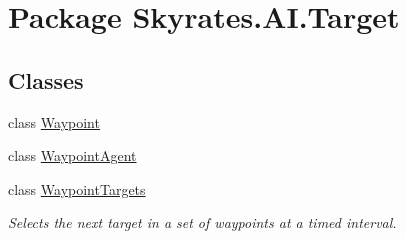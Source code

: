 \hypertarget{namespace_skyrates_1_1_a_i_1_1_target}{\section{Package Skyrates.\-A\-I.\-Target}
\label{namespace_skyrates_1_1_a_i_1_1_target}
}
\subsection*{Classes}
\begin{DoxyCompactItemize}
\item 
class \hyperlink{class_skyrates_1_1_a_i_1_1_target_1_1_waypoint}{Waypoint}
\item 
class \hyperlink{class_skyrates_1_1_a_i_1_1_target_1_1_waypoint_agent}{Waypoint\-Agent}
\item 
class \hyperlink{class_skyrates_1_1_a_i_1_1_target_1_1_waypoint_targets}{Waypoint\-Targets}
\begin{DoxyCompactList}\small\item\em Selects the next target in a set of waypoints at a timed interval. \end{DoxyCompactList}\end{DoxyCompactItemize}
